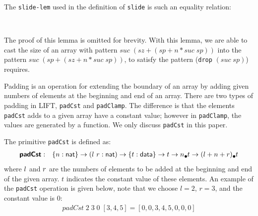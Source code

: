 \documentclass{l4proj}
\begin{document}
The \texttt{slide-lem} used in the definition of \texttt{slide} is such an equality relation:
\begin{code}%
\>[0]\AgdaSpace{}%
\AgdaSymbol{:}%
\>[764I]\AgdaSymbol{(}\AgdaSpace{}%
\AgdaSpace{}%
\AgdaSpace{}%
\AgdaSymbol{:}\AgdaSpace{}%
\AgdaSymbol{)}\AgdaSpace{}%
\<%
\\
\>[.][@{}l@{}]\<[764I]%
\>[12]\AgdaSpace{}%
\AgdaSymbol{(}\AgdaSpace{}%
\AgdaOperator{\AgdaPrimitive{+}}\AgdaSpace{}%
\AgdaSymbol{(}\AgdaSpace{}%
\AgdaOperator{\AgdaPrimitive{+}}\AgdaSpace{}%
\AgdaSpace{}%
\AgdaOperator{\AgdaPrimitive{*}}\AgdaSpace{}%
\AgdaSpace{}%
\AgdaSymbol{))}\AgdaSpace{}%
\AgdaSpace{}%
\AgdaSpace{}%
\AgdaSymbol{(}\AgdaSpace{}%
\AgdaOperator{\AgdaPrimitive{+}}\AgdaSpace{}%
\AgdaSymbol{(}\AgdaSpace{}%
\AgdaOperator{\AgdaPrimitive{+}}\AgdaSpace{}%
\AgdaSpace{}%
\AgdaOperator{\AgdaPrimitive{*}}\AgdaSpace{}%
\AgdaSpace{}%
\AgdaSymbol{))}\<%
\end{code}
The proof of this lemma is omitted for brevity. With this lemma, we are able to cast the size of an array with pattern $suc\; (sz + (sp + n * suc \; sp))$ into the pattern $suc\; (sp + (sz + n * suc \; sp))$, to satisfy the pattern (\texttt{drop} $(suc \; sp)$) requires.

Padding is an operation for extending the boundary of an array by adding given numbers of elements at the beginning and end of an array. There are two types of padding in LIFT, \texttt{padCst} and \texttt{padClamp}. The difference is that the elements \texttt{padCst} adds to a given array have a constant value; however in \texttt{padClamp}, the values are generated by a function. We only discuss \texttt{padCst} in this paper.

The primitive \texttt{padCst} is defined as:
\begin{align}
    \prim{padCst}&:&\{\n : \natkind\} \to (\nat{l}~\nat{r} : \natkind) \to \{\dt : \datatype\} \to \dt \to \lArray{\n}{\dt} \to \lArray{(\nat{l} + \n + \nat{r})}{\dt}
\end{align}
where $l$ and $r$ are the numbers of elements to be added at the beginning and end of the given array. $t$ indicates the constant value of these elements. An example of the \texttt{padCst} operation is given below, note that we choose $l = 2$, $r = 3$, and the constant value is 0:
\begin{align*}
    padCst\; 2\; 3\; 0\; [3, 4, 5] = [0, 0, 3, 4, 5, 0, 0, 0]
\end{align*}
\end{document}
